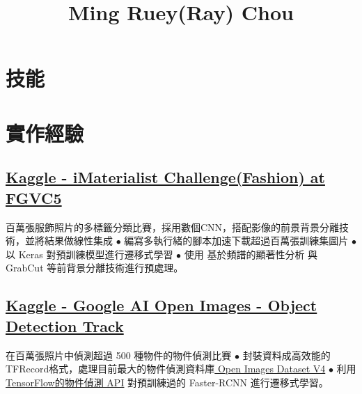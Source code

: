 \documentclass[11pt,a4paper]{moderncv}
\title{Ming Ruey(Ray) Chou}
\begin{document}
\maketitle
\vspace*{-12mm}

\section{技能}
\vspace{-0.8\baselineskip}

\section{實作經驗}

\subsection{\href{https://www.kaggle.com/c/imaterialist-challenge-fashion-2018}{\small Kaggle - iMaterialist Challenge(Fashion) at FGVC5}}
{\footnotesize{百萬張服飾照片的多標籤分類比賽，採用數個CNN，搭配影像的前景背景分離技術，並將結果做線性集成
\newline $\bullet$ 編寫多執行緒的腳本加速下載超過百萬張訓練集圖片\space\space 
\newline $\bullet$以 Keras 對預訓練模型進行遷移式學習
\newline $\bullet$ 使用 基於頻譜的顯著性分析 與 GrabCut 等前背景分離技術進行預處理。}}

\subsection{\href{https://www.kaggle.com/c/google-ai-open-images-object-detection-track}{\small Kaggle - Google AI Open Images - Object Detection Track}}
{\footnotesize{在百萬張照片中偵測超過 500 種物件的物件偵測比賽
\newline $\bullet$ 封裝資料成高效能的TFRecord格式，處理目前最大的物件偵測資料庫\href{https://storage.googleapis.com/openimages/web/index.html}{ Open Images Dataset V4}
\newline $\bullet$ 利用\href{https://github.com/tensorflow/models/tree/master/research/object_detection}{TensorFlow的物件偵測 API} 對預訓練過的 Faster-RCNN 進行遷移式學習。}}
\end{document}
